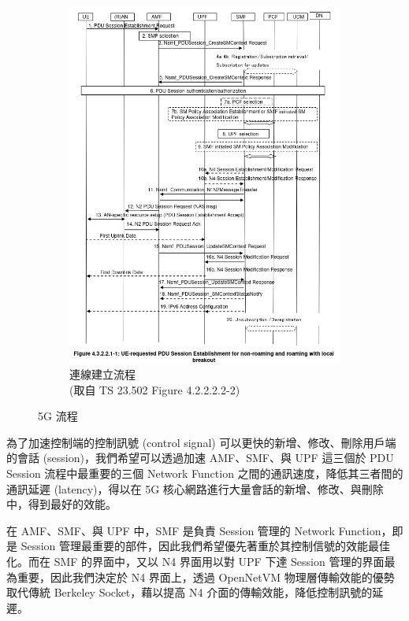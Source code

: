\begin{figure}[htbp]
\begin{subfigure}[b]{.5\linewidth}
      \includegraphics[height=!,width=1\linewidth,keepaspectratio=true]{figures/23_502_4_3_2_2_1-1_sess_establish}
      \caption[連線建立流程]{{連線建立流程\\\scriptsize (取自 TS 23.502 Figure 4.2.2.2.2-2)}}
      \label{fig:sess_establish}
  \end{subfigure}
  \caption[5G 流程]{{\footnotesize 5G 流程~\cite{3gpp.23.502}}}
  \label{fig:5g_procedure}
\end{figure}


為了加速控制端的控制訊號 (control signal) 可以更快的新增、修改、刪除用戶端的會話 (session)，我們希望可以透過加速 AMF、SMF、與 UPF 這三個於 PDU Session 流程中最重要的三個 Network Function 之間的通訊速度，降低其三者間的通訊延遲 (latency)，得以在 5G 核心網路進行大量會話的新增、修改、與刪除中，得到最好的效能。

在 AMF、SMF、與 UPF 中，SMF 是負責 Session 管理的 Network Function，即是 Session 管理最重要的部件，因此我們希望優先著重於其控制信號的效能最佳化。而在 SMF 的界面中，又以 N4 界面用以對 UPF 下達 Session 管理的界面最為重要，因此我們決定於 N4 界面上，透過 OpenNetVM 物理層傳輸效能的優勢取代傳統 Berkeley Socket，藉以提高 N4 介面的傳輸效能，降低控制訊號的延遲。

